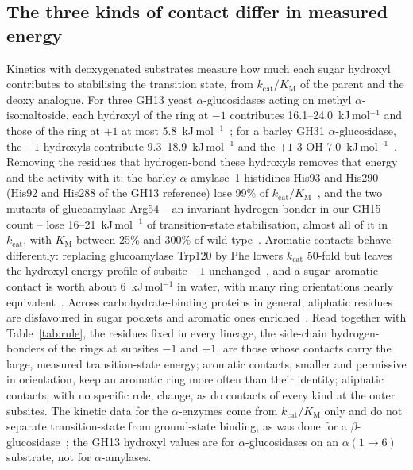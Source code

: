 \documentclass[preprint,12pt]{elsarticle}
\begin{document}
\subsection{The three kinds of contact differ in measured energy}
Kinetics with
deoxygenated substrates measure how much each sugar hydroxyl contributes to stabilising
the transition state, from $k_\mathrm{cat}/K_\mathrm{M}$ of the parent and the deoxy
analogue. For three GH13 yeast $\alpha$-glucosidases acting on methyl
$\alpha$-isomaltoside, each hydroxyl of the ring at $-1$ contributes 16.1--24.0~kJ\,mol$^{-1}$
and those of the ring at $+1$ at most 5.8~kJ\,mol$^{-1}$~\citep{Frandsen2002}; for a barley
GH31 $\alpha$-glucosidase, the $-1$ hydroxyls contribute 9.3--18.9~kJ\,mol$^{-1}$ and the
$+1$ 3-OH 7.0~kJ\,mol$^{-1}$~\citep{Frandsen2000}. Removing the residues that hydrogen-bond
these hydroxyls removes that energy and the activity with it: the barley $\alpha$-amylase~1
histidines His93 and His290 (His92 and His288 of the GH13 reference) lose 99\% of $k_\mathrm{cat}/K_\mathrm{M}$~\citep{Sogaard1993}, and the two
mutants of glucoamylase Arg54 -- an invariant hydrogen-bonder in our GH15 count -- lose
16--21~kJ\,mol$^{-1}$ of transition-state stabilisation, almost all of it in $k_\mathrm{cat}$,
with $K_\mathrm{M}$ between 25\% and 300\% of wild type~\citep{Frandsen1995}. Aromatic
contacts behave differently: replacing glucoamylase Trp120 by Phe lowers $k_\mathrm{cat}$
50-fold but leaves the hydroxyl energy profile of subsite $-1$ unchanged~\citep{Sierks2000},
and a sugar--aromatic contact is worth about 6~kJ\,mol$^{-1}$ in water, with many ring
orientations nearly equivalent~\citep{Asensio2013}. Across carbohydrate-binding proteins in
general, aliphatic residues are disfavoured in sugar pockets and aromatic ones
enriched~\citep{Hudson2015}. Read together with Table~\ref{tab:rule}, the
residues fixed in every lineage, the side-chain hydrogen-bonders of the rings at subsites
$-1$ and $+1$, are those whose contacts carry the large, measured transition-state energy;
aromatic contacts, smaller and permissive in orientation, keep an aromatic ring more often
than their identity; aliphatic contacts, with no specific role, change, as do contacts of
every kind at the outer subsites. The
kinetic data for the $\alpha$-enzymes come from $k_\mathrm{cat}/K_\mathrm{M}$ only and do
not separate transition-state from ground-state binding, as was done for a
$\beta$-glucosidase~\citep{Namchuk1995}; the GH13 hydroxyl values are for
$\alpha$-glucosidases on an $\alpha(1\!\to\!6)$ substrate, not for $\alpha$-amylases.
\end{document}

